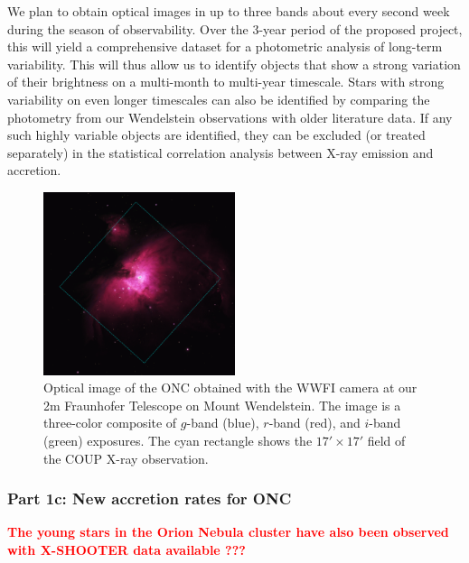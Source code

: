 \documentclass[10pt,fleqn,twoside]{article}
\newcommand{\todo}[1]{\textcolor{red}{\bf #1}}
\newcommand{\Tcol}{\color{blue}}
\begin{document}
We plan to obtain optical images in up to three bands 
about every second week during the season of observability.
Over the 3-year period of the proposed project, this will yield
a comprehensive dataset for a photometric analysis of long-term
variability.
This will thus
allow us to identify objects that show a strong
variation of their brightness on a multi-month to multi-year timescale.
Stars with strong variability on even longer timescales can also be
identified by comparing the photometry from our Wendelstein observations
with older literature data.
%
If any such highly variable objects are identified, they can be excluded
(or treated separately) in the statistical correlation analysis
between X-ray emission and accretion.


\begin{figure} %
\centering
\includegraphics[width=0.5\textwidth]{onc-coupfield-2.ps}
\caption{Optical image of the ONC obtained with the WWFI camera
at our 2m Fraunhofer Telescope on Mount Wendelstein.
The image is a three-color composite of $g$-band (blue), $r$-band
(red), and $i$-band (green) exposures.
The cyan rectangle shows the $17' \times 17'$
field of the COUP X-ray observation.
\label{onc-wwfi.fig}}
\end{figure} %




\bigskip

\subsubsection*{\Tcol Part 1c: New accretion rates for ONC}


\todo{The young stars in the Orion Nebula cluster have also been
observed with X-SHOOTER data available ??? }
 
\end{document}

